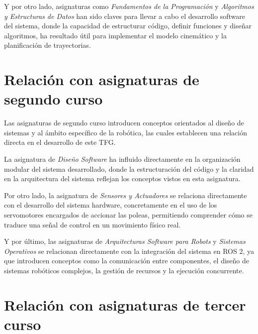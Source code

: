 \vspace{0.25cm}

Y por otro lado, asignaturas como \textit{Fundamentos de la Programación} y \newline \textit{Algoritmos y Estructuras de Datos} han sido claves para llevar a cabo el desarrollo software del sistema, donde la capacidad de estructurar código, definir funciones y diseñar algoritmos, ha resultado útil para implementar el modelo cinemático y la planificación de trayectorias.

\section{Relación con asignaturas de segundo curso}
\label{sec:segundaseccion}

Las asignaturas de segundo curso introducen conceptos orientados al diseño de sistemas y al ámbito específico de la robótica, las cuales establecen una relación directa en el desarrollo de este TFG.

\vspace{0.25cm}

La asignatura de \textit{Diseño Software} ha influido directamente en la organización modular del sistema desarrollado, donde la estructuración del código y la claridad en la arquitectura del sistema reflejan los conceptos vistos en esta asignatura.

\vspace{0.25cm}

Por otro lado, la asignatura de \textit{Sensores y Actuadores} se relaciona directamente con el desarrollo del sistema hardware, concretamente en el uso de los servomotores encargados de accionar las poleas, permitiendo comprender cómo se traduce una señal de control en un movimiento físico real.

\vspace{0.25cm}

Y por último, las asignaturas de \textit{Arquitecturas Software para Robots} y \newline \textit{Sistemas Operativos} se relacionan directamente con la integración del sistema en ROS 2, ya que introducen conceptos como la comunicación entre componentes, el diseño de sistemas robóticos complejos, la gestión de recursos y la ejecución concurrente.

\section{Relación con asignaturas de tercer curso}
\label{sec:segundaseccion}


